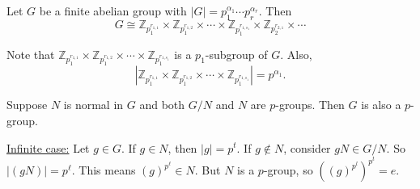 \begin{example}
	Let $G$ be a finite abelian group with $|G|=p_1^{\alpha_1}\cdots p_r^{\alpha_r}$. Then 
	$$G\cong\mathbb Z_{p_1^{r_{1,1}}}\times \mathbb Z_{p_1^{r_{1,2}}}\times\cdots\times \mathbb Z_{p_1^{r_{1,s_1}}}\times \mathbb Z_{p_2^{r_{2,1}}}\times\cdots$$

	Note that $\mathbb Z_{p_1^{r_{1,1}}}\times \mathbb Z_{p_1^{r_{1,2}}}\times\cdots\times \mathbb Z_{p_1^{r_{1,s_1}}}$ is a $p_1$-subgroup of $G$. Also,
	$$|\mathbb Z_{p_1^{r_{1,1}}}\times \mathbb Z_{p_1^{r_{1,2}}}\times\cdots\times \mathbb Z_{p_1^{r_{1,s_1}}}|=p^{\alpha_1}.$$
\end{example}

\begin{example}
	Suppose $N$ is normal in $G$ and both $G/N$ and $N$ are $p$-groups. Then $G$ is also a $p$-group.

	\underline{Infinite case:} Let $g\in G$. If $g\in N$, then $|g|=p^t$. If $g\not\in N$, consider $gN\in G/N$. So $|(gN)|=p^\ell$. This means $(g)^{p^\ell}\in N$. But $N$ is a $p$-group, so $((g)^{p^l})^{p^t}=e$.
\end{example}